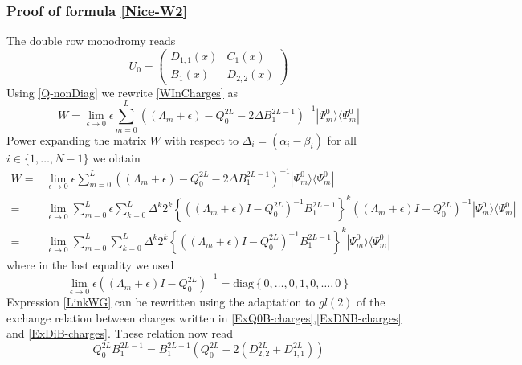 \documentclass[10pt]{article}
\numberwithin{equation}{section}
\numberwithin{equation}{subsection}
\begin{document}
\subsubsection{Proof of formula \eqref{Nice-W2}}
The double row monodromy reads
\begin{equation}
	U_{0}=\begin{pmatrix}
		D_{1,1}(x)&C_{1}(x)\\
		B_{1}(x)&D_{2,2}(x)
	\end{pmatrix}
\end{equation}
Using \eqref{Q-nonDiag} we rewrite \eqref{WInCharges} as
\begin{equation}\label{W}
	W=\lim_{\epsilon\to 0}\epsilon\sum_{m=0}^{L}\left((\Lambda_{m}+\epsilon)-Q_{0}^{2L}-2\Delta B_{1}^{2L-1}\right)^{-1}|\Psi_{m}^{0}\rangle \langle \Psi_{m}^{0}|
\end{equation}
Power expanding the matrix $W$ with respect to $\Delta_{i}=(\alpha_{i}-\beta_{i})$ for all $i\in\{1,\ldots,N-1\}$ we obtain 
\begin{equation}\label{LinkWG}
	\begin{split}
		W=&\lim_{\epsilon\to 0}\epsilon\sum_{m=0}^{L}\left((\Lambda_{m}+\epsilon)-Q_{0}^{2L}-2\Delta B_{1}^{2L-1}\right)^{-1}|\Psi_{m}^{0}\rangle\langle \Psi_{m}^{0}|\\
		=&\lim_{\epsilon\to 0}\sum_{m=0}^{L}\epsilon\sum_{k=0}^{L}\Delta^{k}2^{k}\left\{\left((\Lambda_{m}+\epsilon)I-Q_{0}^{2L}\right)^{-1}B_{1}^{2L-1}\right\}^{k}\left((\Lambda_{m}+\epsilon)I-Q_{0}^{2L}\right)^{-1}|\Psi_{m}^{0}\rangle\langle \Psi_{m}^{0}|
		\\=&
		\lim_{\epsilon\to0}\sum_{m=0}^{L}\sum_{k=0}^{L}\Delta^{k}2^{k}\left\{\left((\Lambda_{m}+\epsilon)I-Q_{0}^{2L}\right)^{-1}B_{1}^{2L-1}\right\}^{k}|\Psi_{m}^{0}\rangle\langle \Psi_{m}^{0}|
	\end{split}
\end{equation}
where in the last equality we used 
\begin{equation}
	\lim_{\epsilon\to 0}\epsilon\left((\Lambda_{m}+\epsilon)I-Q_{0}^{2L}\right)^{-1}=\text{diag}\left\{0,\ldots,0,1,0,\ldots,0\right\}
\end{equation}
Expression \eqref{LinkWG} can be rewritten using the adaptation to $gl(2)$ of the exchange relation between charges written in \eqref{ExQ0B-charges},\eqref{ExDNB-charges} and \eqref{ExDiB-charges}. These relation now read
\begin{equation}\label{exchangeQ0B}
	Q_{0}^{2L}B_{1}^{2L-1}=B_{1}^{2L-1}\left(Q_{0}^{2L}-2\left(D_{2,2}^{2L}+D_{1,1}^{2L}\right)\right)
\end{equation}
\end{document}
